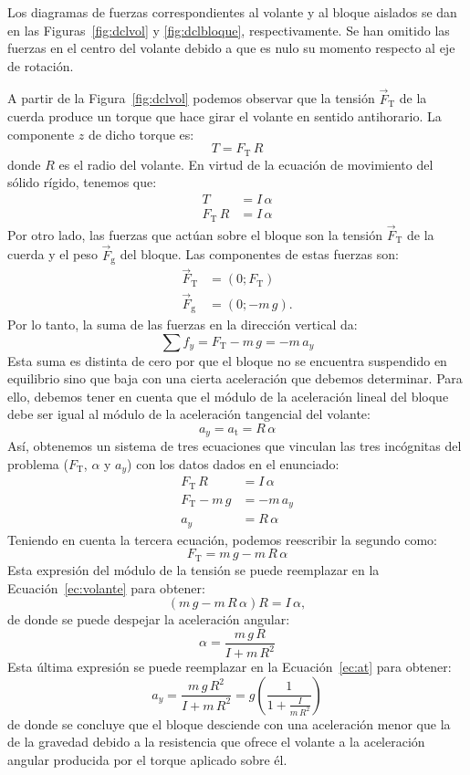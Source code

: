 \documentclass[addpoints]{exam}
\begin{document}
\begin{questions}
    \begin{solution}
    Los diagramas de fuerzas correspondientes al volante y al bloque aislados se dan en las Figuras~\ref{fig:dclvol} y \ref{fig:dclbloque}, respectivamente. Se han omitido las fuerzas en el centro del volante debido a que es nulo su momento respecto al eje de rotación.

    A partir de la Figura~\ref{fig:dclvol} podemos observar que la tensión $\vec{F}_\text{T}$ de la cuerda produce un torque que hace girar el volante en sentido antihorario. La componente $z$ de dicho torque es: $$T = F_\text{T} \, R$$ donde $R$ es el radio del volante. En virtud de la ecuación de movimiento del sólido rígido, tenemos que:
    \begin{equation*}
        \begin{split}
            T &= I \, \alpha \\
        F_\text{T} \, R &= I \, \alpha
        \end{split}
    \end{equation*} Por otro lado, las fuerzas que actúan sobre el bloque son la tensión $\vec{F}_\text{T}$ de la cuerda y el peso $\vec{F}_\text{g}$ del bloque. Las componentes de estas fuerzas son:
    \begin{align*}
        \vec{F}_\text{T} &= \left(0;F_\text{T}\right) \\
        \vec{F}_\text{g} &= \left(0;-m \, g\right).
    \end{align*} Por lo tanto, la suma de las fuerzas en la dirección vertical da: $$\sum f_y = F_\text{T} - m \, g = - m \, a_y$$ Esta suma es distinta de cero por que el bloque no se encuentra suspendido en equilibrio sino que baja con una cierta aceleración que debemos determinar. Para ello, debemos tener en cuenta que el módulo de la aceleración lineal del bloque debe ser igual al módulo de la aceleración tangencial del volante: $$a_y = a_\text{t} = R \, \alpha$$ Así, obtenemos un sistema de tres ecuaciones que vinculan las tres incógnitas del problema ($F_\text{T}$, $\alpha$ y $a_y$) con los datos dados en el enunciado:
    \begin{align}
        F_\text{T} \, R &= I \, \alpha \label{ec:volante} \\
        F_\text{T} - m \, g &= - m \, a_y  \label{ec:bloque} \\
        a_y &= R \, \alpha  \label{ec:at}
    \end{align} Teniendo en cuenta la tercera ecuación, podemos reescribir la segundo como: $$F_\text{T} = m \, g - m \, R \, \alpha $$ Esta expresión del módulo de la tensión se puede reemplazar en la Ecuación~\eqref{ec:volante} para obtener: $$\left(m \, g - m \, R \, \alpha\right) R = I \, \alpha ,$$ de donde se puede despejar la aceleración angular: $$\alpha = \frac{m \, g \, R}{I + m \, R^2}$$ Esta última expresión se puede reemplazar en la Ecuación~\eqref{ec:at} para obtener: $$a_y = \frac{m \, g \, R^2}{I + m \, R^2} = g \left(\frac{1}{1 + \frac{I}{m \, R^2}}\right)$$ de donde se concluye que el bloque desciende con una aceleración menor que la de la gravedad debido a la resistencia que ofrece el volante a la aceleración angular producida por el torque aplicado sobre él.


\end{solution}
\end{questions}
\end{document}
